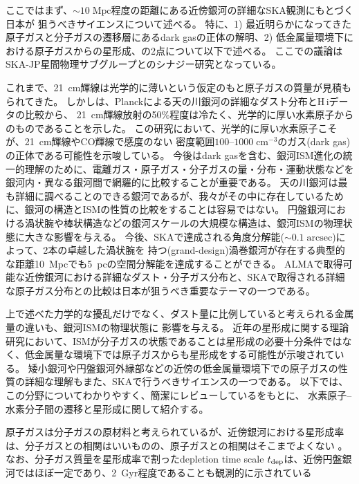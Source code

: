 ここではまず、$\sim 10\;\mbox{Mpc}$程度の距離にある近傍銀河の詳細なSKA観測にもとづく日本が
狙うべきサイエンスについて述べる。
特に、1) 最近明らかになってきた原子ガスと分子ガスの遷移層にあるdark gasの正体の解明、2)
低金属量環境下における原子ガスからの星形成、の2点について以下で述べる。
ここでの議論はSKA-JP星間物理サブグループとのシナジー研究となっている。

これまで、21~cm輝線は光学的に薄いという仮定のもと原子ガスの質量が見積もられてきた。
しかし\citet{2015ApJ...798....6F}は、Planckによる天の川銀河の詳細なダスト分布と{\sc H\,i}データの比較から、
21~cm輝線放射の50\%程度は冷たく、光学的に厚い水素原子からのものであることを示した。
この研究において、光学的に厚い水素原子こそが、21~cm輝線やCO輝線で感度のない
密度範囲$100\mbox{--}1000 \; \mbox{cm}^{-3}$のガス(dark gas)の正体である可能性を示唆している。
今後はdark gasを含む、銀河ISM進化の統一的理解のために、電離ガス・原子ガス・分子ガスの量・分布・運動状態などを銀河内・異なる銀河間で網羅的に比較することが重要である。
天の川銀河は最も詳細に調べることのできる銀河であるが、我々がその中に存在しているために、銀河の構造とISMの性質の比較をすることは容易ではない。
円盤銀河における渦状腕や棒状構造などの銀河スケールの大規模な構造は、銀河ISMの物理状態に大きな影響を与える。
今後、SKAで達成される角度分解能($\sim 0.1\; \mbox{arcsec}$)によって、2本の卓越した渦状腕を
持つ(grand-design)渦巻銀河が存在する典型的な距離10~Mpcでも5~pcの空間分解能を達成することができる。
ALMAで取得可能な近傍銀河における詳細なダスト・分子ガス分布と、SKAで取得される詳細な原子ガス分布との比較は日本が狙うべき重要なテーマの一つである。


上で述べた力学的な擾乱だけでなく、ダスト量に比例していると考えられる金属量の違いも、銀河ISMの物理状態に
影響を与える。
近年の星形成に関する理論研究において、ISMが分子ガスの状態であることは星形成の必要十分条件ではなく、低金属量な環境下では原子ガスからも星形成をする可能性が示唆されている。
矮小銀河や円盤銀河外縁部などの近傍の低金属量環境下での原子ガスの性質の詳細な理解もまた、SKAで行うべきサイエンスの一つである。
以下では、この分野についてわかりやすく、簡潔にレビューしている\citet{krumholtz2013}をもとに、
水素原子--水素分子間の遷移と星形成に関して紹介する。

原子ガスは分子ガスの原材料と考えられているが、近傍銀河における星形成率は、分子ガスとの相関はいいものの、原子ガスとの相関はそこまでよくない
\citep{2002ApJ...569..157W, kennicutt2007, 2008AJ....136.2846B, 2008AJ....136.2782L}。
なお、分子ガス質量を星形成率で割ったdepletion time scale $t_{\rm dep}$は、近傍円盤銀河ではほぼ一定であり、2~Gyr程度であることも観測的に示されている\citep{bigiel2011}

